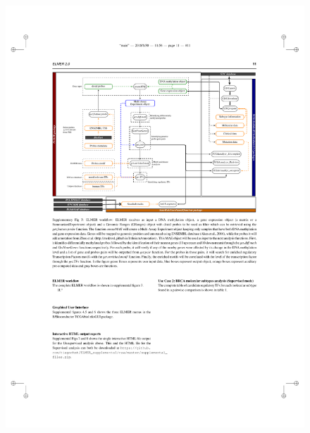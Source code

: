 \documentclass[slidestop,compress,11pt,xcolor=dvipsnames]{beamer}
\begin{document}
\begin{frame}[plain]%
 \begin{figure}
  \hspace*{-1cm}
  \includegraphics[width=1.18\linewidth]{ELMER/workflow_new.pdf}
 \end{figure}
\end{frame}
\end{document}
